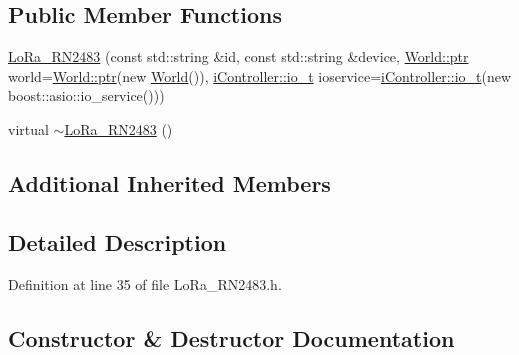 \subsection*{Public Member Functions}
\begin{DoxyCompactItemize}
\item 
\hyperlink{classo_cpt_1_1components_1_1comm_1_1_lo_ra___r_n2483_ae3f0939b0261a350befa1c00a619150a}{Lo\+Ra\+\_\+\+R\+N2483} (const std\+::string \&id, const std\+::string \&device, \hyperlink{classo_cpt_1_1_world_aa6e591e3096d5de71e0cec9039663d67}{World\+::ptr} world=\hyperlink{classo_cpt_1_1_world_aa6e591e3096d5de71e0cec9039663d67}{World\+::ptr}(new \hyperlink{classo_cpt_1_1_world}{World}()), \hyperlink{classo_cpt_1_1i_controller_a51c3436b03060209f6cd2ddce6df2d0c}{i\+Controller\+::io\+\_\+t} ioservice=\hyperlink{classo_cpt_1_1i_controller_a51c3436b03060209f6cd2ddce6df2d0c}{i\+Controller\+::io\+\_\+t}(new boost\+::asio\+::io\+\_\+service()))
\item 
virtual \hyperlink{classo_cpt_1_1components_1_1comm_1_1_lo_ra___r_n2483_a30d55c900718ac38d0207c6f678ca96c}{$\sim$\+Lo\+Ra\+\_\+\+R\+N2483} ()
\end{DoxyCompactItemize}
\subsection*{Additional Inherited Members}


\subsection{Detailed Description}


Definition at line 35 of file Lo\+Ra\+\_\+\+R\+N2483.\+h.



\subsection{Constructor \& Destructor Documentation}
\hypertarget{classo_cpt_1_1components_1_1comm_1_1_lo_ra___r_n2483_ae3f0939b0261a350befa1c00a619150a}{}\label{classo_cpt_1_1components_1_1comm_1_1_lo_ra___r_n2483_ae3f0939b0261a350befa1c00a619150a} 
